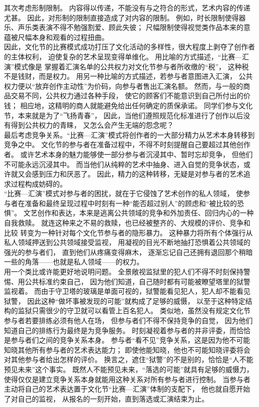 \documentclass{article}
\begin{document}
    其次考虑形制限制。
    内容得以传递，不能没有与之符合的形式，艺术内容的传递尤甚。
    因此，对形制的限制直接造成了对内容的限制。
    例如，时长限制使得器乐、声乐类表演不得不勉强割爱、顾此失彼；
    尺幅限制使得视觉类作品本来的意蕴被尺幅本身和观看的过程扭曲。\\

    因此，文化节的比赛模式成功打压了文化活动的多样性，很大程度上剥夺了创作者的主体权利，
    迫使复杂的艺术呈现变得单维化。
    用比喻的方式描述，“比赛—汇演”模式像是
    掌握着汇演名单的公共权力对文化节参与者所收缴的“税”，
    这种税不是钱财，而是权力。
    用另一种比喻的方式描述，若参与者意图进入汇演，
    公共权力便以“放弃创作主动性”为价码，向参与者售出汇演名额。
    然而，与一般的商品交易不同，公共权力通过各种手段，
    使它的顾客们不能意识到自己所付出的价钱；
    相应地，这精明的商人就能避免给出任何确定的质保承诺。
    同学们参与文化节，本来就是为了“飞扬青春”，
    因此，当他们遵照规范化标准进行了创作以后没有得到公共权力的青睐，
    又怎么会产生无端的怨念呢？\\

    最后考虑竞争关系。“比赛—汇演”模式将创作者的一大部分精力从艺术本身转移到竞争之中。
    文化节的参与者在准备过程中，不得不时刻提醒自己要超过其他创作者。
    或许艺术本身的魅力能够使一部分参与者沉浸其中、暂时忘却竞争，
    但他们不可能永远沉浸其中。
    而当他们从纯粹的艺术中抽身、进入自觉的竞争状态，或许就又会感到压力和厌恶了。
    因此，精力的这种转移，无疑是对参与者的艺术追求过程构成妨碍的。\\

    “比赛—汇演”模式对参与者的困扰，就在于它侵蚀了艺术创作的私人领域，
    使参与者在准备和最终呈现过程中时刻有一种“能否超过别人”的顾虑和“被比较的恐惧”。
    文艺创作和表达，本来是逃离公共领域的竞争和外加责任、回归内心的一种自我救赎。
    就连这种来之不易的救赎，也已经被整齐的、大规模的评价、竞争和比较
    转变为一种针对每个文化节参与者的隐形暴力。
    这种暴力将所有个体强行从私人领域押送到公共领域接受监视，
    用凝视的目光不断地抽打恐惧着公共领域的强光的参与者们，
    直到他们从疼痛变得麻木，
    逐渐忘记自己还拥有退回那个稍暗一些的角落——也就是私人领域——的权力。\\

    用一个类比或许能更好地说明问题。
    全景敞视监狱里的犯人们不得不时刻保持警惕、用公共标准约束自己，
    因为他们知道，自己随时都有可能被瞭望塔里的狱警监视着。
    而由于守卫塔的玻璃是单面可视的，狱警能看见犯人，犯人却不能看见狱警，
    因此这种“做坏事被发现的可能”就构成了足够的威慑，
    以至于这种特定结构的监狱只需很少的守卫就可以看管上百名犯人。
    类似地，虽然没有规定文化节参与者若要排练必须有他人在场，
    但参与者们不得不保持竞争的自觉，
    因为他们知道自己的排练行为最终是为竞争服务。
    时刻凝视着参与者的并非评委，而恰恰是参与者们之间的竞争关系本身。
    参与者“看不见”竞争关系，这是因为他不可能知晓其他所有参与者的艺术表达能力；
    即使他能知晓，他也不可能知晓评委将会对其他参与者给出怎样的评价。
    换言之，遮住“狱警”的不是别的，恰恰是“人不能预见未来”这个事实。
    既然人不能预见未来，“落选的可能”就具有足够的威慑力，
    使得仅仅是建立竞争关系本身就能用这种关系对所有参与者进行控制。
    当参与者主动将自己的艺术表达置于文化节“比赛—汇演”体制的支配下，
    他也就自愿开始了对自己的监视，
    从报名的一刻开始，直到落选或汇演结束为止。\\
\end{document}
